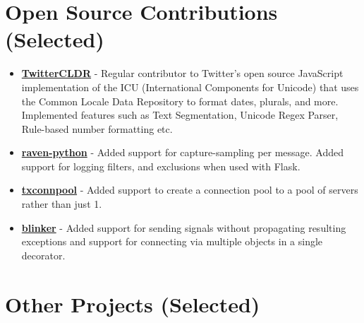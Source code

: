 \section{Open Source Contributions
(Selected)}\label{open-source-contributions-selected}

\begin{itemize}
\tightlist
\item
  \href{https://github.com/twitter/twitter-cldr-js}{\textbf{TwitterCLDR}}
  - Regular contributor to Twitter's open source JavaScript
  implementation of the ICU (International Components for Unicode) that
  uses the Common Locale Data Repository to format dates, plurals, and
  more. Implemented features such as Text Segmentation, Unicode Regex
  Parser, Rule-based number formatting etc.
\item
  \href{https://github.com/getsentry/raven-python}{\textbf{raven-python}}
  - Added support for capture-sampling per message. Added support for
  logging filters, and exclusions when used with Flask.
\item
  \href{https://github.com/zopim/txconnpool}{\textbf{txconnpool}} -
  Added support to create a connection pool to a pool of servers rather
  than just 1.
\item
  \href{https://github.com/zopim/blinker}{\textbf{blinker}} - Added
  support for sending signals without propagating resulting exceptions
  and support for connecting via multiple objects in a single decorator.
\end{itemize}

\section{Other Projects (Selected)}\label{other-projects-selected}

